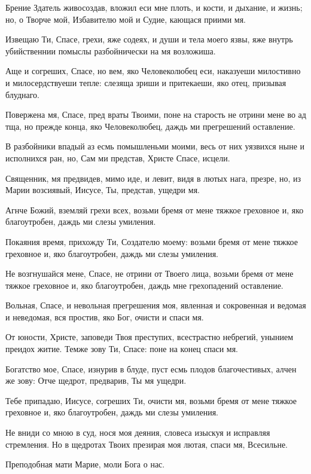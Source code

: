 Брение Здатель живосоздав, вложил еси мне плоть, и кости, и дыхание, и жизнь; но, о Творче мой, Избавителю мой и Судие, кающася приими мя.

Извещаю Ти, Спасе, грехи, яже содеях, и души и тела моего язвы, яже внутрь убийственнии помыслы разбойнически на мя возложиша.

Аще и согреших, Спасе, но вем, яко Человеколюбец еси, наказуеши милостивно и милосердствуеши тепле: слезяща зриши и притекаеши, яко отец, призывая блуднаго.

Повержена мя, Спасе, пред враты Твоими, поне на старость не отрини мене во ад тща, но прежде конца, яко Человеколюбец, даждь ми прегрешений оставление.

В разбойники впадый аз есмь помышленьми моими, весь от них уязвихся ныне и исполнихся ран, но, Сам ми представ, Христе Спасе, исцели.

Священник, мя предвидев, мимо иде, и левит, видя в лютых нага, презре, но, из Марии возсиявый, Иисусе, Ты, представ, ущедри мя.

Агнче Божий, вземляй грехи всех, возьми бремя от мене тяжкое греховное и, яко благоутробен, даждь ми слезы умиления.

Покаяния время, прихожду Ти, Создателю моему: возьми бремя от мене тяжкое греховное и, яко благоутробен, даждь ми слезы умиления.

Не возгнушайся мене, Спасе, не отрини от Твоего лица, возьми бремя от мене тяжкое греховное и, яко благоутробен, даждь мне грехопадений оставление.

Вольная, Спасе, и невольная прегрешения моя, явленная и сокровенная и ведомая и неведомая, вся простив, яко Бог, очисти и спаси мя.

От юности, Христе, заповеди Твоя преступих, всестрастно небрегий, унынием преидох житие. Темже зову Ти, Спасе: поне на конец спаси мя.

Богатство мое, Спасе, изнурив в блуде, пуст есмь плодов благочестивых, алчен же зову: Отче щедрот, предварив, Ты мя ущедри.

Тебе припадаю, Иисусе, согреших Ти, очисти мя, возьми бремя от мене тяжкое греховное и, яко благоутробен, даждь ми слезы умиления.

Не вниди со мною в суд, нося моя деяния, словеса изыскуя и исправляя стремления. Но в щедротах Твоих презирая моя лютая, спаси мя, Всесильне.


Преподобная мати Марие, моли Бога о нас.

